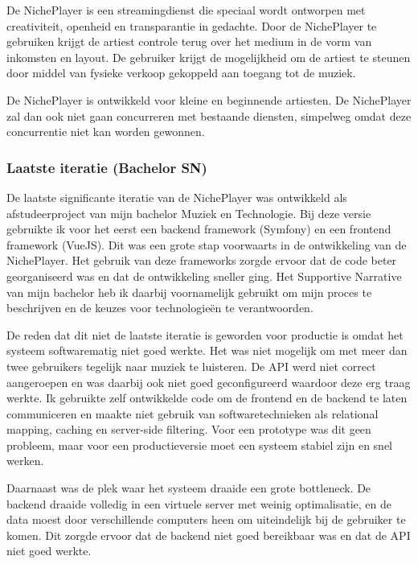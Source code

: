 De NichePlayer is een streamingdienst die speciaal wordt ontworpen met creativiteit, openheid en transparantie in gedachte. Door de NichePlayer te gebruiken krijgt de artiest controle terug over het medium in de vorm van inkomsten en layout. De gebruiker krijgt de mogelijkheid om de artiest te steunen door middel van fysieke verkoop gekoppeld aan toegang tot de muziek. 

De NichePlayer is ontwikkeld voor kleine en beginnende artiesten. De NichePlayer zal dan ook niet gaan concurreren met bestaande diensten, simpelweg omdat deze concurrentie niet kan worden gewonnen.

\subsubsection*{Laatste iteratie (Bachelor SN)}
De laatste significante iteratie van de NichePlayer was ontwikkeld als afstudeerproject van mijn bachelor Muziek en Technologie. Bij deze versie gebruikte ik voor het eerst een backend framework (Symfony) en een frontend framework (VueJS). Dit was een grote stap voorwaarts in de ontwikkeling van de NichePlayer. Het gebruik van deze frameworks zorgde ervoor dat de code beter georganiseerd was en dat de ontwikkeling sneller ging. Het Supportive Narrative van mijn bachelor heb ik daarbij voornamelijk gebruikt om mijn proces te beschrijven en de keuzes voor technologieën te verantwoorden.

De reden dat dit niet de laatste iteratie is geworden voor productie is omdat het systeem softwarematig niet goed werkte. Het was niet mogelijk om met meer dan twee gebruikers tegelijk naar muziek te luisteren. De API werd niet correct aangeroepen en was daarbij ook niet goed geconfigureerd waardoor deze erg traag werkte. Ik gebruikte zelf ontwikkelde code om de frontend en de backend te laten communiceren en maakte niet gebruik van softwaretechnieken als relational mapping, caching en server-side filtering. Voor een prototype was dit geen probleem, maar voor een productieversie moet een systeem stabiel zijn en snel werken.

Daarnaast was de plek waar het systeem draaide een grote bottleneck. De backend draaide volledig in een virtuele server met weinig optimalisatie, en de data moest door verschillende computers heen om uiteindelijk bij de gebruiker te komen. Dit zorgde ervoor dat de backend niet goed bereikbaar was en dat de API niet goed werkte.

